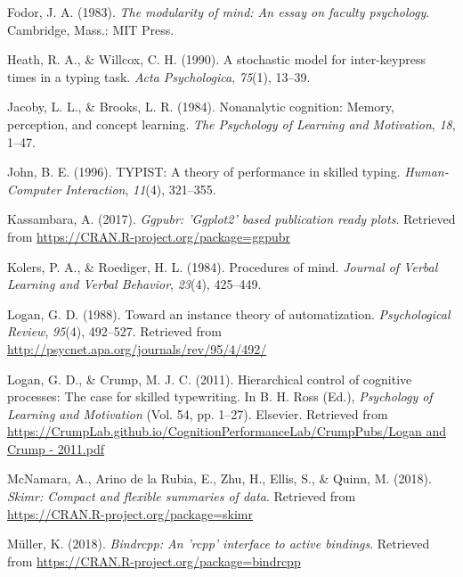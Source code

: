\documentclass[floatsintext,man]{apa6}
\theoremstyle{definition}
\theoremstyle{definition}
\theoremstyle{definition}
\theoremstyle{remark}
\begin{document}
\hypertarget{ref-fodor_modularity_1983}{}
Fodor, J. A. (1983). \emph{The modularity of mind: An essay on faculty
psychology}. Cambridge, Mass.: MIT Press.

\hypertarget{ref-heath_stochastic_1990}{}
Heath, R. A., \& Willcox, C. H. (1990). A stochastic model for
inter-keypress times in a typing task. \emph{Acta Psychologica},
\emph{75}(1), 13--39.

\hypertarget{ref-JacobyNonanalyticcognitionMemory1984}{}
Jacoby, L. L., \& Brooks, L. R. (1984). Nonanalytic cognition: Memory,
perception, and concept learning. \emph{The Psychology of Learning and
Motivation}, \emph{18}, 1--47.

\hypertarget{ref-john_typist:_1996}{}
John, B. E. (1996). TYPIST: A theory of performance in skilled typing.
\emph{Human-Computer Interaction}, \emph{11}(4), 321--355.

\hypertarget{ref-R-ggpubr}{}
Kassambara, A. (2017). \emph{Ggpubr: 'Ggplot2' based publication ready
plots}. Retrieved from \url{https://CRAN.R-project.org/package=ggpubr}

\hypertarget{ref-KolersProceduresmind1984}{}
Kolers, P. A., \& Roediger, H. L. (1984). Procedures of mind.
\emph{Journal of Verbal Learning and Verbal Behavior}, \emph{23}(4),
425--449.

\hypertarget{ref-logan_toward_1988}{}
Logan, G. D. (1988). Toward an instance theory of automatization.
\emph{Psychological Review}, \emph{95}(4), 492--527. Retrieved from
\url{http://psycnet.apa.org/journals/rev/95/4/492/}

\hypertarget{ref-logan_hierarchical_2011}{}
Logan, G. D., \& Crump, M. J. C. (2011). Hierarchical control of
cognitive processes: The case for skilled typewriting. In B. H. Ross
(Ed.), \emph{Psychology of Learning and Motivation} (Vol. 54, pp.
1--27). Elsevier. Retrieved from
\href{https://CrumpLab.github.io/CognitionPerformanceLab/CrumpPubs/Logan\%20and\%20Crump\%20-\%202011.pdf}{https://CrumpLab.github.io/CognitionPerformanceLab/CrumpPubs/Logan and Crump - 2011.pdf}

\hypertarget{ref-R-skimr}{}
McNamara, A., Arino de la Rubia, E., Zhu, H., Ellis, S., \& Quinn, M.
(2018). \emph{Skimr: Compact and flexible summaries of data}. Retrieved
from \url{https://CRAN.R-project.org/package=skimr}

\hypertarget{ref-R-bindrcpp}{}
Müller, K. (2018). \emph{Bindrcpp: An 'rcpp' interface to active
bindings}. Retrieved from
\url{https://CRAN.R-project.org/package=bindrcpp}
\end{document}
